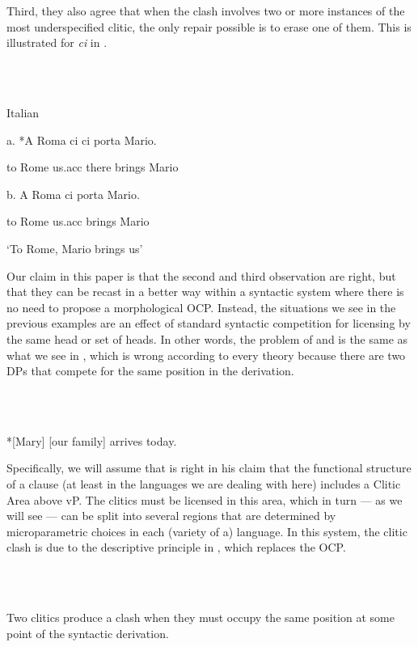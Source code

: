 \documentclass[output=paper,colorlinks,citecolor=brown]{./langscibook}
\begin{document}
Third, they also agree that when the clash involves two or more instances of the most underspecified clitic, the only repair possible is to erase one of them. This is illustrated for \textit{ci} in .

\ea%
    \label{ex:key:5}
    \gll\\
        \\
    \glt
    \z

          Italian 

    a. *A Roma  ci  ci   porta   Mario.

              to Rome  us.acc  there  brings  Mario

    b. A Roma   ci  porta   Mario.      

                   to Rome  us.acc  brings  Mario

    ‘To Rome, Mario brings us’

Our claim in this paper is that the second and third observation are right, but that they can be recast in a better way within a syntactic system where there is no need to propose a morphological OCP. Instead, the situations we see in the previous examples are an effect of standard syntactic competition for licensing by the same head or set of heads. In other words, the problem of  and  is the same as what we see in , which is wrong according to every theory because there are two DPs that compete for the same position in the derivation.

\ea%
    \label{ex:key:6}
    \gll\\
        \\
    \glt
    \z

            *[Mary] [our family] arrives today.

Specifically, we will assume that \citet{Sportiche1996} is right in his claim that the functional structure of a clause (at least in the languages we are dealing with here) includes a Clitic Area above vP. The clitics must be licensed in this area, which in turn — as we will see — can be split into several regions that are determined by microparametric choices in each (variety of a) language. In this system, the clitic clash is due to the descriptive principle in , which replaces the OCP.

\ea%
    \label{ex:key:7}
    \gll\\
        \\
    \glt
    \z

          Two clitics produce a clash when they must occupy the same   position at some point of the syntactic derivation.
\end{document}
